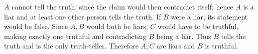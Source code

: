 $A$ cannot tell the truth, since the claim would then contradict itself; hence $A$ is a liar and at least one other person tells the truth. If $B$ were a liar, its statement would be false. Since $A,B$ would both be liars, $C$ would have to be truthful, making exactly one truthful and contradicting $B$ being a liar. Thus $B$ tells the truth and is the only truth-teller. Therefore $A,C$ are liars and $B$ is truthful.
